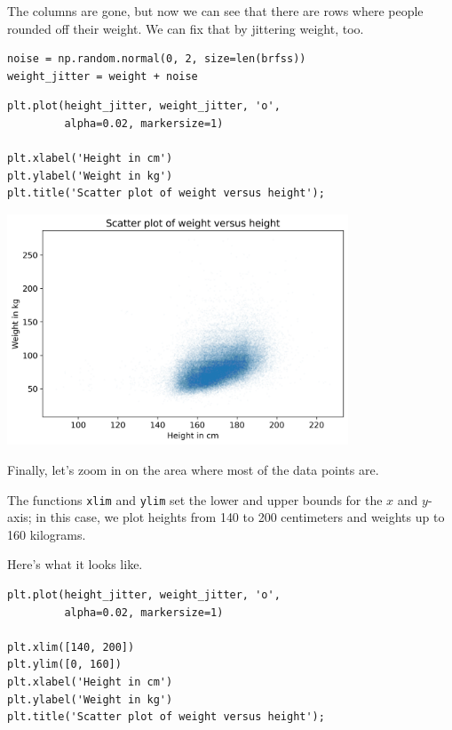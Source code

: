 The columns are gone, but now we can see that there are rows where
people rounded off their weight. We can fix that by jittering weight,
too.

\begin{lstlisting}[]
noise = np.random.normal(0, 2, size=len(brfss))
weight_jitter = weight + noise
\end{lstlisting}

\begin{lstlisting}[]
plt.plot(height_jitter, weight_jitter, 'o', 
         alpha=0.02, markersize=1)

plt.xlabel('Height in cm')
plt.ylabel('Weight in kg')
plt.title('Scatter plot of weight versus height');
\end{lstlisting}

\begin{center}
\includegraphics[width=4in]{chapters/09_relationships_files/09_relationships_23_0.png}
\end{center}

Finally, let's zoom in on the area where most of the data points are.

The functions \passthrough{\lstinline!xlim!} and
\passthrough{\lstinline!ylim!} set the lower and upper bounds for the
\(x\) and \(y\)-axis; in this case, we plot heights from 140 to 200
centimeters and weights up to 160 kilograms.

Here's what it looks like.

\begin{lstlisting}[]
plt.plot(height_jitter, weight_jitter, 'o', 
         alpha=0.02, markersize=1)

plt.xlim([140, 200])
plt.ylim([0, 160])
plt.xlabel('Height in cm')
plt.ylabel('Weight in kg')
plt.title('Scatter plot of weight versus height');
\end{lstlisting}

